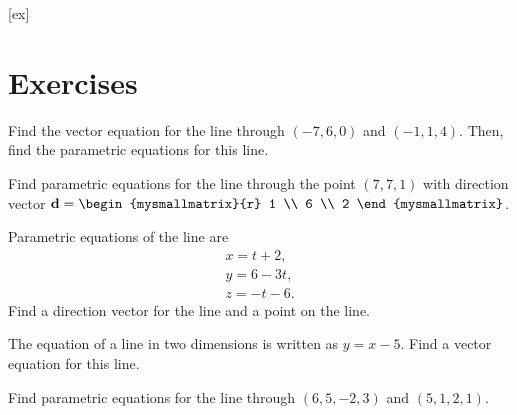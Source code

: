 [ex]
\section*{Exercises}


\begin{ex} 
  Find the vector equation for the line through $(-7,6,0)$ and
  $(-1,1,4)$. Then, find the parametric equations for this
  line.
\end{ex}

\begin{ex}
  Find parametric equations for the line through the point
  $(7,7,1)$ with direction vector
  $\vect{d} = \begin{mysmallmatrix}{r} 1 \\ 6 \\ 2 \end{mysmallmatrix}$.
\end{ex} 

\begin{ex}
  Parametric equations of the line are 
  \begin{equation*}
    \begin{array}{c}
      x = t+2, \\
      y = 6-3t, \\
      z = -t-6.
    \end{array}
  \end{equation*}
  Find a direction vector for the line and a point on the line.
\end{ex} 

\begin{ex}
  The equation of a line in two dimensions is written as $y=x-5$. Find
  a vector equation for this line.
\end{ex} 

\begin{ex}
  Find parametric equations for the line through $(6, 5, -2, 3)$
  and $(5, 1, 2, 1)$.
\end{ex} 

